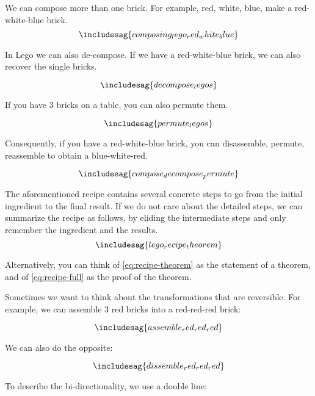 We can compose more than one brick.
For example, red, white, blue, make a red-white-blue brick.
\begin{equation}
\includesag{composing_lego_red_white_blue}
\end{equation}

In Lego we can also de-compose. If we have a red-white-blue brick, we can also recover
the single bricks.

\begin{equation}
  \includesag{decompose_legos}
\end{equation}

If you have 3 bricks on a table, you can also permute them.

\begin{equation}
\includesag{permute_legos}
\end{equation}

Consequently, if you have a red-white-blue brick, you can disassemble, permute, reassemble to obtain a blue-white-red.

\begin{equation}
  \label{eq:recipe-full}
\includesag{compose_decompose_permute}
\end{equation}


The aforementioned recipe contains several concrete steps to go from the initial ingredient to the final result.
If we do not care about the detailed steps, we can summarize the recipe as follows, by eliding the intermediate steps and only remember the ingredient and the results.
\begin{equation}\label{eq:recipe-theorem}
\includesag{lego_recipe_theorem}
\end{equation}

Alternatively, you can think of \cref{eq:recipe-theorem} as the statement of a theorem, and of \cref{eq:recipe-full} as the proof of the theorem.

Sometimes we want to think about the transformations that are reversible.
For example, we can assemble 3 red bricks into a red-red-red brick:

\begin{equation}
\includesag{assemble_red_red_red}
\end{equation}

We can also do the opposite:

\begin{equation}
\includesag{dissemble_red_red_red}
\end{equation}

To describe the bi-directionality, we use a double line:

